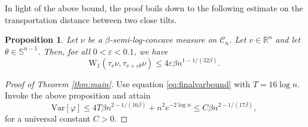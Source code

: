 \documentclass[12pt]{article}
\def \RR {\mathbb R}
\def \Var {\mathrm{Var}}
\def \eps {\varepsilon}
\def \DC {\mathcal{C}_n}
\newtheorem{proposition}[theorem]{Proposition}
\theoremstyle{definition}
\theoremstyle{remark}
\begin{document}
In light of the above bound, the proof boils down to the following estimate on the transportation distance between two close tilts.
\begin{proposition} \label{prop:transport}
Let $\nu$ be a $\beta$-semi-log-concave measure on $\DC$. Let $v \in \RR^n$ and let $\theta \in \mathbb{S}^{n-1}$. Then, for all $0 < \eps < 0.1$, we have
$$
\mathrm{W}_1(\tau_v \nu, \tau_{v + \eps \theta} \nu) \leq 4 \eps \beta n^{1-1/(32 \beta)}.
$$
\end{proposition}
\begin{proof}[Proof of Theorem \ref{thm:main}]
Use equation \eqref{eq:finalvarbound} with $T = 16 \log n$. Invoke the above proposition and attain
$$
\Var[\varphi] \leq 4 T \beta n^{2-1/(16 \beta)} + n^2 e^{-2 \log n} \leq C \beta n^{2-1/(17 \beta)},
$$
for a universal constant $C>0$.
\end{proof}
\end{document}
